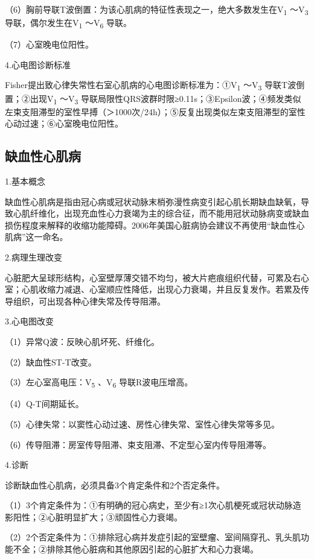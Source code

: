 （6）胸前导联T波倒置：为该心肌病的特征性表现之一，绝大多数发生在V\textsubscript{1}
～V\textsubscript{3} 导联，偶尔发生在V\textsubscript{1}
～V\textsubscript{6} 导联。

（7）心室晚电位阳性。

4.心电图诊断标准

Fisher提出致心律失常性右室心肌病的心电图诊断标准为：①V\textsubscript{1}
～V\textsubscript{3} 导联T波倒置；②出现V\textsubscript{1}
～V\textsubscript{3}
导联局限性QRS波群时限≥0.11s；③Epsilon波；④频发类似左束支阻滞型的室性早搏（＞1000次/24h）；⑤反复出现类似左束支阻滞型的室性心动过速；⑥心室晚电位阳性。

\protect\hypertarget{text00051.htmlux5cux23subid618}{}{}

\subsection{缺血性心肌病}

1.基本概念

缺血性心肌病是指由冠心病或冠状动脉末梢弥漫性病变引起心肌长期缺血缺氧，导致心肌纤维化，出现充血性心力衰竭为主的综合征，而不能用冠状动脉病变或缺血损伤程度来解释的收缩功能障碍。2006年美国心脏病协会建议不再使用“缺血性心肌病”这一命名。

2.病理生理改变

心脏肥大呈球形结构，心室壁厚薄交错不均匀，被大片疤痕组织代替，可累及右心室；心肌收缩力减退、心室顺应性降低，出现心力衰竭，并且反复发作。若累及传导组织，可出现各种心律失常及传导阻滞。

3.心电图改变

（1）异常Q波：反映心肌坏死、纤维化。

（2）缺血性ST-T改变。

（3）左心室高电压：V\textsubscript{5} 、V\textsubscript{6}
导联R波电压增高。

（4）Q-T间期延长。

（5）心律失常：以窦性心动过速、房性心律失常、室性心律失常等多见。

（6）传导阻滞：房室传导阻滞、束支阻滞、不定型心室内传导阻滞等。

4.诊断

诊断缺血性心肌病，必须具备3个肯定条件和2个否定条件。

（1）3个肯定条件为：①有明确的冠心病史，至少有≥1次心肌梗死或冠状动脉造影阳性；②心脏明显扩大；③顽固性心力衰竭。

（2）2个否定条件为：①排除冠心病并发症引起的室壁瘤、室间隔穿孔、乳头肌功能不全；②排除其他心脏病和其他原因引起的心脏扩大和心力衰竭。

